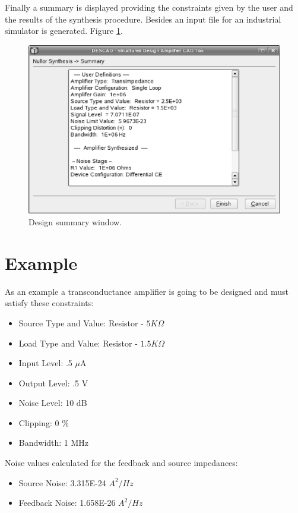 \documentclass[twocolumn]{IEEEtran}
\begin{document}
Finally a summary is displayed providing the constraints given by the user and the results of the synthesis procedure. Besides an input file for an industrial simulator is generated. Figure \ref{fig:descad7}.

\begin{figure}[hbtp]
	\centering
	\includegraphics[scale=0.3]{figuras/wizard8.eps}
	\caption{Design summary window.}
	\label{fig:descad7}
\end{figure}

\section{Example}
As an example a transconductance amplifier is going to be designed and must satisfy these constraints:

\begin{itemize}
\item Source Type and Value: Resistor - $5K{\Omega}$
\item Load Type and Value: Resistor - $1.5K{\Omega}$
\item Input Level: .5 $\mu$A
\item Output Level: .5 V
\item Noise Level: 10 dB
\item Clipping: 0 \%
\item Bandwidth: 1 MHz
\end{itemize}

Noise values calculated for the feedback and source impedances:

\begin{itemize}
\item Source Noise: 3.315E-24 $A^2/Hz$
\item Feedback Noise: 1.658E-26 $A^2/Hz$
\end{itemize}
\end{document}
